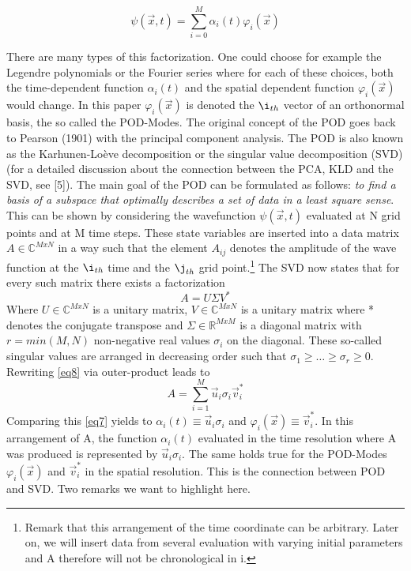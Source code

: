 \documentclass[usenatbib]{mn2e}
\begin{document}
\begin{equation}\label{eq7}
\psi( \overrightarrow {x},t) = \sum_{i=0}^M \alpha_i(t) \varphi_i(\overrightarrow{x}) 
\end{equation} 

There are many types of this factorization. One could choose for example the Legendre polynomials or the Fourier series where for each of these choices, both the time-dependent function \(\alpha_i(t)\) and the spatial dependent function \(\varphi_i(\overrightarrow{x})\) would change. In this paper \(\varphi_i(\overrightarrow{x})\) is denoted the \(\i_{th}\) vector of an orthonormal basis, the so called the POD-Modes. The original concept of the POD goes back to Pearson (1901) with the principal component analysis. The POD is also known as the Karhunen-Loève decomposition or the singular value decomposition (SVD) (for a detailed discussion about the connection between the PCA, KLD and the SVD, see [5]). The main goal of the POD can be formulated as follows: \textit{to find a basis of a subspace that optimally describes a set of data in a least square sense}. \\
This can be shown by considering the wavefunction  \(\psi( \overrightarrow {x},t)\) evaluated at N grid points and at M time steps. These state variables are inserted into a data matrix \(A \in \mathbb{C}^{MxN}\) in a way such that the element \(A_{ij}\) denotes the amplitude of the wave function at the \(\i_{th}\) time and the \(\j_{th}\) grid point.\footnote{Remark that this arrangement of the time coordinate can be arbitrary. Later on, we will insert data from several evaluation with varying initial parameters and A therefore will not be chronological in i.}
The SVD now states that for every such matrix there exists a factorization
\begin{equation}\label{eq8}
A=U\Sigma V^*
\end{equation} 
Where \(U \in \mathbb{C}^{MxN} \) is a unitary matrix, \(V \in \mathbb{C}^{MxN} \) is a unitary matrix where * denotes the conjugate transpose and \(\Sigma \in \mathbb{R}^{MxM} \) is a diagonal matrix with \(r=min(M,N)\) non-negative real values \(\sigma_i\) on the diagonal. These so-called singular values are arranged in decreasing order such that \(\sigma_1 \geq \dots \geq \sigma_r \geq 0\). Rewriting \ref{eq8} via outer-product leads to 
\begin{equation}\label{eq9}
A=\sum_{i=1}^M \overrightarrow{u}_i \sigma_i \overrightarrow{v}_i^*
\end{equation} 
Comparing this \ref{eq7} yields to \(\alpha_i(t) \equiv \overrightarrow{u}_i \sigma_i \) and \(\varphi_i(\overrightarrow{x}) \equiv \overrightarrow{v}_i^*\). In this arrangement of A, the function \(\alpha_i(t)\) evaluated in the time resolution where A was produced is represented by \(\overrightarrow{u}_i \sigma_i \). The same holds true for the POD-Modes \(\varphi_i(\overrightarrow{x})\) and \(\overrightarrow{v}_i^*\) in the spatial resolution. This is the connection between POD and SVD. Two remarks we want to highlight here.
\end{document}
